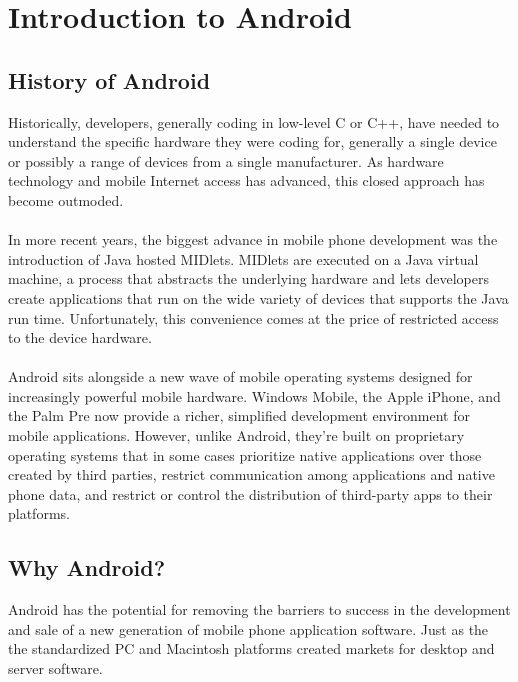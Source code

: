 
\section{Introduction to Android}
\subsection{History of Android}
Historically, developers, generally coding in low-level C or C++, have needed to
understand the specific hardware they were coding for, generally a single device
or possibly a range of devices from a single manufacturer. As hardware technology
and mobile Internet access has advanced, this closed approach has become
outmoded.
\\\\
In more recent years, the biggest advance in mobile phone development was the
introduction of Java hosted MIDlets. MIDlets are executed on a Java virtual
machine, a process that abstracts the underlying hardware and lets developers
create applications that run on the wide variety of devices that supports the
Java run time. Unfortunately, this convenience comes at the price of restricted
access to the device hardware.
\\\\
Android sits alongside a new wave of mobile operating systems designed for
increasingly powerful mobile hardware. Windows Mobile, the Apple iPhone, and the
Palm Pre now provide a richer, simplified development environment for mobile
applications. However, unlike Android, they're built on proprietary operating
systems that in some cases prioritize native applications over those created by
third parties, restrict communication among applications and native phone data,
and restrict or control the distribution of third-party apps to their platforms.

\subsection{Why Android?}
Android has the potential for removing the barriers to success in the development
and sale of a new generation of mobile phone application software. Just as the
the standardized PC and Macintosh platforms created markets for desktop and
server software.


